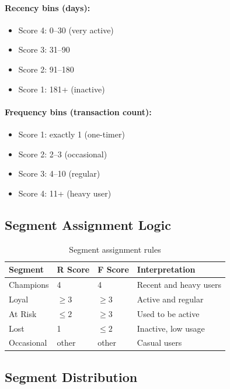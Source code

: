 \documentclass[11pt,a4paper]{article}
\begin{document}
\paragraph{Recency bins (days):}
\begin{itemize}[noitemsep]
    \item Score 4: 0--30 (very active)
    \item Score 3: 31--90
    \item Score 2: 91--180
    \item Score 1: 181+ (inactive)
\end{itemize}

\paragraph{Frequency bins (transaction count):}
\begin{itemize}[noitemsep]
    \item Score 1: exactly 1 (one-timer)
    \item Score 2: 2--3 (occasional)
    \item Score 3: 4--10 (regular)
    \item Score 4: 11+ (heavy user)
\end{itemize}

\subsection{Segment Assignment Logic}

\begin{table}[H]
\centering
\begin{tabular}{llll}
\toprule
\textbf{Segment} & \textbf{R Score} & \textbf{F Score} & \textbf{Interpretation} \\
\midrule
Champions & 4 & 4 & Recent and heavy users \\
Loyal & $\geq 3$ & $\geq 3$ & Active and regular \\
At Risk & $\leq 2$ & $\geq 3$ & Used to be active \\
Lost & 1 & $\leq 2$ & Inactive, low usage \\
Occasional & other & other & Casual users \\
\bottomrule
\end{tabular}
\caption{Segment assignment rules}
\end{table}

\subsection{Segment Distribution}
\end{document}
